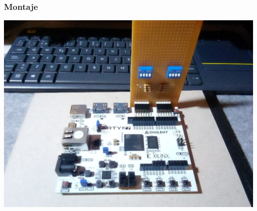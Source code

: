 \documentclass[spanish]{beamer}
\begin{document}
\begin{frame}
    \frametitle{Montaje}
    \centering
    \includegraphics[width=\textwidth]{img/montaje.jpeg}
\end{frame}
\end{document}
